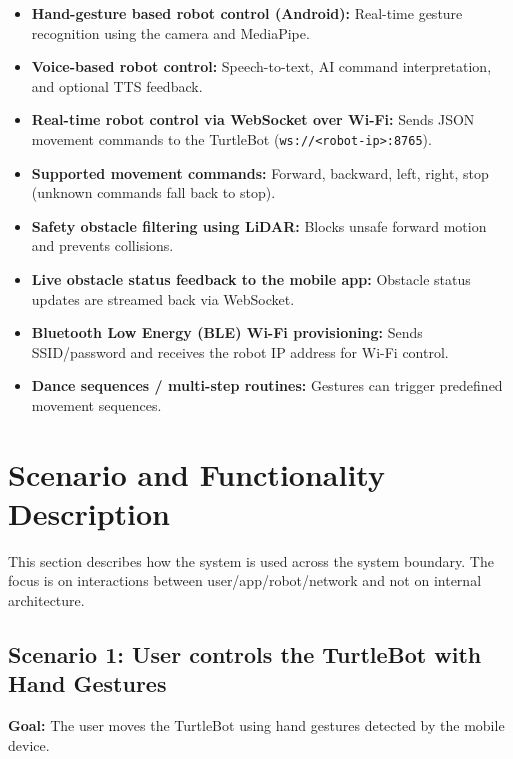 \documentclass[11pt,a4paper]{article}
\begin{document}
\begin{itemize}[leftmargin=1.5cm]
	
	\item \textbf{Hand-gesture based robot control (Android):}
	Real-time gesture recognition using the camera and MediaPipe.
	
	\item \textbf{Voice-based robot control:}
	Speech-to-text, AI command interpretation, and optional TTS feedback.
	
	\item \textbf{Real-time robot control via WebSocket over Wi-Fi:}
	Sends JSON movement commands to the TurtleBot (\texttt{ws://<robot-ip>:8765}).
	
	\item \textbf{Supported movement commands:}
	Forward, backward, left, right, stop (unknown commands fall back to stop).
	
	\item \textbf{Safety obstacle filtering using LiDAR:}
	Blocks unsafe forward motion and prevents collisions.
	
	\item \textbf{Live obstacle status feedback to the mobile app:}
	Obstacle status updates are streamed back via WebSocket.
	
	\item \textbf{Bluetooth Low Energy (BLE) Wi-Fi provisioning:}
	Sends SSID/password and receives the robot IP address for Wi-Fi control.
	
	\item \textbf{Dance sequences / multi-step routines:}
	Gestures can trigger predefined movement sequences.
	
\end{itemize}

\newpage
\section{Scenario and Functionality Description}

This section describes how the system is used across the system boundary.
The focus is on interactions between user/app/robot/network and not on internal architecture.

\subsection{Scenario 1: User controls the TurtleBot with Hand Gestures}
\textbf{Goal:} The user moves the TurtleBot using hand gestures detected by the mobile device.
\end{document}
